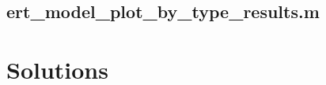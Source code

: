\subsection{ert\_model\_plot\_by\_type\_results.m\label{app:ert_model_plot_by_type_results}}


\ifDisplaySolutions%
\newpage
\appendix
\section{Solutions}

\fi
